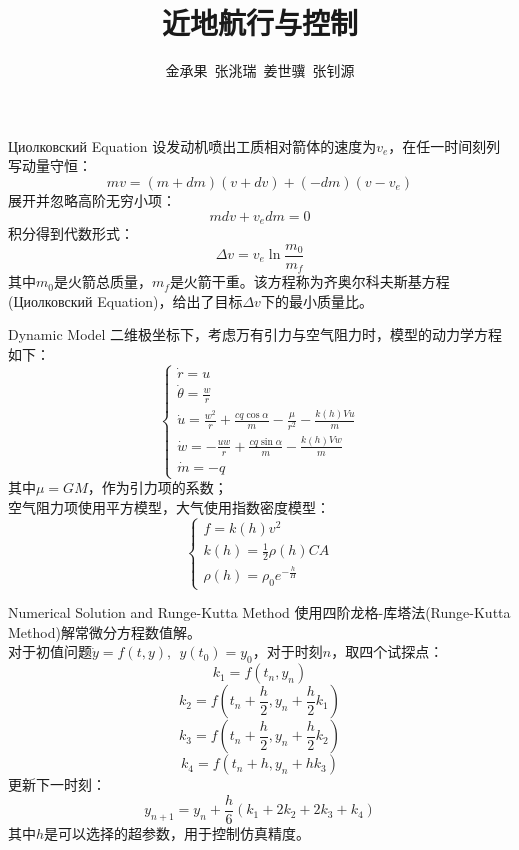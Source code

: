 \documentclass[aspectratio=169]{beamer} %
\title{近地航行与控制}
\author{金承果~张洮瑞~姜世骥~张钊源}
\institute{}
\begin{document}
	
	\begin{frame}
		\titlepage
	\end{frame}
	
	\begin{frame}{Циолковский Equation}
		设发动机喷出工质相对箭体的速度为$v_e$，在任一时间刻列写动量守恒：
		$$
		mv = (m+dm)(v+dv) + (-dm)(v-v_e)
		$$
		展开并忽略高阶无穷小项：
		$$
		mdv + v_e dm = 0
		$$
		积分得到代数形式：
		$$
		\Delta v = v_e \ln \frac{m_0}{m_f}
		$$
		其中$m_0$是火箭总质量，$m_f$是火箭干重。该方程称为齐奥尔科夫斯基方程(Циолковский Equation)，给出了目标$\Delta v$下的最小质量比。
	\end{frame}
	
	\begin{frame}{Dynamic Model}
		二维极坐标下，考虑万有引力与空气阻力时，模型的动力学方程如下：
		$$
		\begin{cases}
			\dot{r} = u \\
			\dot{\theta} = \frac{w}{r} \\
			\dot{u} = \frac{w^2}{r} + \frac{cq\cos\alpha}{m} - \frac{\mu}{r^2} - \frac{k(h)Vu}{m} \\
			\dot{w} = -\frac{uw}{r} + \frac{cq\sin\alpha}{m} - \frac{k(h)Vw}{m} \\
			\dot{m} = -q
		\end{cases}
		$$
		其中$\mu = GM$，作为引力项的系数；\\
		空气阻力项使用平方模型，大气使用指数密度模型：
		$$
		\begin{cases}
			f = k(h)v^2 \\
			k(h) = \frac{1}{2}\rho(h) C A \\
			\rho(h) = \rho_0 e^{-\frac{h}{H}}
		\end{cases}
		$$
		
	\end{frame}
	
	\begin{frame}{Numerical Solution and Runge-Kutta Method}
		使用四阶龙格-库塔法(Runge-Kutta Method)解常微分方程数值解。\\
		对于初值问题$\dot{y} = f(t,y),~~y(t_0) = y_0$，对于时刻$n$，取四个试探点：
		$$
		k_1 = f(t_n,y_n)
		$$
		$$
		k_2 = f(t_n+\frac{h}{2},y_n+\frac{h}{2}k_1)
		$$
		$$
		k_3 = f(t_n+\frac{h}{2},y_n+\frac{h}{2}k_2)
		$$
		$$
		k_4 = f(t_n+h,y_n+h k_3)
		$$
		更新下一时刻：
		$$
		y_{n+1} = y_n + \frac{h}{6}(k_1+2k_2+2k_3+k_4)
		$$
		其中$h$是可以选择的超参数，用于控制仿真精度。
	\end{frame}
	
\end{document}
